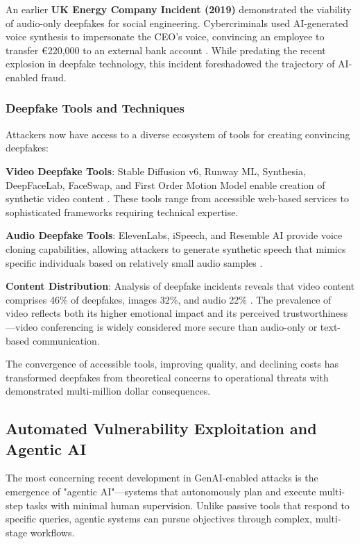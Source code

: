 An earlier \textbf{UK Energy Company Incident (2019)} demonstrated the viability of audio-only deepfakes for social engineering. Cybercriminals used AI-generated voice synthesis to impersonate the CEO's voice, convincing an employee to transfer €220,000 to an external bank account \cite{zerothreat2025}. While predating the recent explosion in deepfake technology, this incident foreshadowed the trajectory of AI-enabled fraud.

\subsubsection{Deepfake Tools and Techniques}

Attackers now have access to a diverse ecosystem of tools for creating convincing deepfakes:

\textbf{Video Deepfake Tools}: Stable Diffusion v6, Runway ML, Synthesia, DeepFaceLab, FaceSwap, and First Order Motion Model enable creation of synthetic video content \cite{zerothreat2025}. These tools range from accessible web-based services to sophisticated frameworks requiring technical expertise.

\textbf{Audio Deepfake Tools}: ElevenLabs, iSpeech, and Resemble AI provide voice cloning capabilities, allowing attackers to generate synthetic speech that mimics specific individuals based on relatively small audio samples \cite{zerothreat2025}.

\textbf{Content Distribution}: Analysis of deepfake incidents reveals that video content comprises 46\% of deepfakes, images 32\%, and audio 22\% \cite{zerothreat2025}. The prevalence of video reflects both its higher emotional impact and its perceived trustworthiness—video conferencing is widely considered more secure than audio-only or text-based communication.

The convergence of accessible tools, improving quality, and declining costs has transformed deepfakes from theoretical concerns to operational threats with demonstrated multi-million dollar consequences.

\subsection{Automated Vulnerability Exploitation and Agentic AI}

The most concerning recent development in GenAI-enabled attacks is the emergence of "agentic AI"—systems that autonomously plan and execute multi-step tasks with minimal human supervision. Unlike passive tools that respond to specific queries, agentic systems can pursue objectives through complex, multi-stage workflows.

